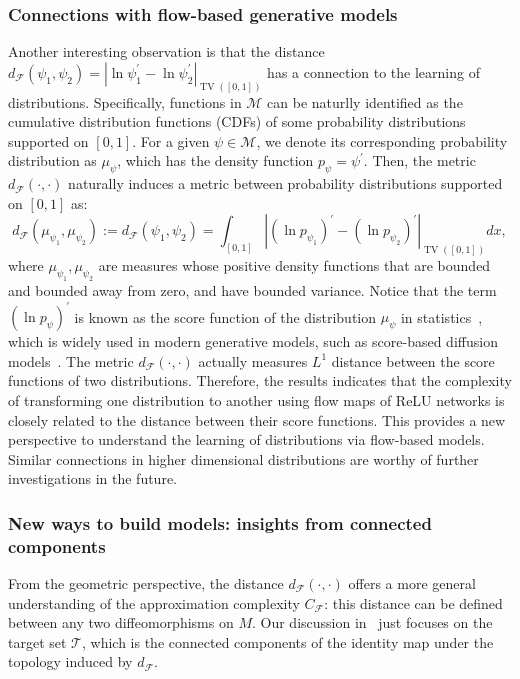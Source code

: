 \documentclass[12pt]{amsart}
\numberwithin{equation}{section}
\theoremstyle{remark}
\begin{document}
\subsubsection{Connections with flow-based generative models}
Another interesting observation is that the distance $d_{\mathcal F}(\psi_1, \psi_2) = |\ln \psi_1^\prime-\ln \psi_2^\prime|_{\operatorname{TV}([0,1])}$ has a connection to the learning of distributions. Specifically, functions in $\mathcal M$ can be naturlly identified as the cumulative distribution functions (CDFs) of some probability distributions supported on $[0,1]$.
For a given $\psi\in \mathcal M$, we denote its corresponding probability distribution as $\mu_\psi$, which has the density function $p_\psi = \psi^\prime$.
Then, the metric $d_{\mathcal F}(\cdot, \cdot)$ naturally induces a metric between probability distributions supported on $[0,1]$ as:
\begin{equation}
    d_{\mathcal F}(\mu_{\psi_1}, \mu_{\psi_2}) := d_{\mathcal F}(\psi_1, \psi_2) = \int_{[0,1]}|(\ln p_{\psi_1})^\prime - (\ln p_{\psi_2})^\prime|_{\operatorname{TV}([0,1])}dx,
\end{equation}
where $\mu_{\psi_1}, \mu_{\psi_2}$ are measures whose positive density functions that are bounded and bounded away from zero,  and have bounded variance.
Notice that the term $(\ln p_\psi)^\prime$ is known as the score function of the distribution $\mu_\psi$ in statistics~\cite{lehmann1998theory}, which is widely used in modern generative models, such as score-based diffusion models~\cite{song2019generative,ho2020denoising,song2020improved}. The metric $d_{\mathcal F}(\cdot, \cdot)$ actually measures $L^1$ distance between the score functions of two distributions.
Therefore, the results indicates that the complexity of transforming one distribution to another using flow maps of ReLU networks is closely related to the distance between their score functions. This provides a new perspective to understand the learning of distributions via flow-based models.
Similar connections in higher dimensional distributions are worthy of further investigations in the future.

\subsubsection{New ways to build models: insights from connected components}
\label{sec:new_ways_build_model}
From the geometric perspective, the distance $d_{\mathcal F}(\cdot, \cdot)$ offers a more general understanding of the approximation complexity $C_{\mathcal F}$: this distance can be defined between any two diffeomorphisms on $M$. Our discussion in~ just focuses on the target set $\mathcal T$, which is the connected components of the identity map under the topology induced by $d_{\mathcal F}$.
\end{document}
